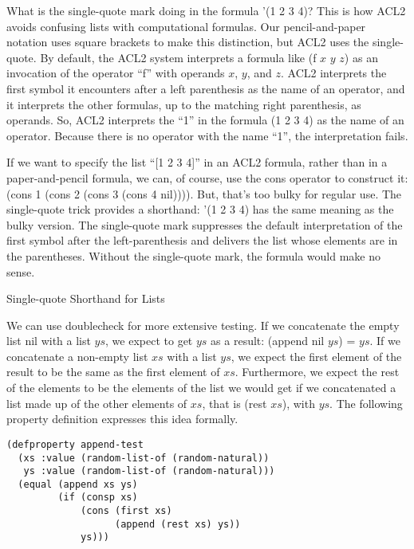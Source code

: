 \begin{aside}
What is the single-quote mark doing in the formula '(1 2 3 4)?
This is how ACL2 avoids confusing lists with computational formulas.
Our pencil-and-paper notation uses square brackets to make this distinction,
but ACL2 uses the single-quote.
By default, the ACL2 system interprets a formula like
(f $x$ $y$ $z$) as an invocation of the operator ``f'' with operands $x$, $y$, and $z$.
ACL2 interprets the first symbol it encounters after a left parenthesis
as the name of an operator, and it interprets the other formulas,
up to the matching right parenthesis, as operands.
So, ACL2 interprets the ``1'' in the formula (1 2 3 4) as the name of an operator.
Because there is no operator with the name ``1'', the interpretation fails.

If we want to specify the list ``[1 2 3 4]'' in an ACL2 formula,
rather than in a paper-and-pencil formula,
we can, of course, use the cons operator to construct it:
(cons 1 (cons 2 (cons 3 (cons 4 nil)))).
But, that's too bulky for regular use.
The single-quote trick provides a shorthand:
'(1 2 3 4) has the same meaning as the bulky version.
The single-quote mark suppresses the default interpretation
of the first symbol after the left-parenthesis and
delivers the list whose elements are in the parentheses.
Without the single-quote mark,
the formula would make no sense.
\caption{Single-quote Shorthand for Lists}
\label{quote}
\end{aside}

We can use doublecheck for more extensive testing.
If we concatenate the empty list nil with a list $ys$,
we expect to get $ys$ as a result: (append nil $ys$) = $ys$.
If we concatenate a non-empty list $xs$ with a list $ys$,
we expect the first element of the result to be the same as
the first element of $xs$.
Furthermore, we expect the rest of the elements to be
the elements of the list we would get if we concatenated
a list made up of the other elements of $xs$, that is (rest $xs$),
with $ys$. The following property definition expresses this idea formally.

\begin{samepage}
\begin{Verbatim}
(defproperty append-test
  (xs :value (random-list-of (random-natural))
   ys :value (random-list-of (random-natural)))
  (equal (append xs ys)
         (if (consp xs)
             (cons (first xs)
                   (append (rest xs) ys))
             ys)))
\end{Verbatim}
\end{samepage}

